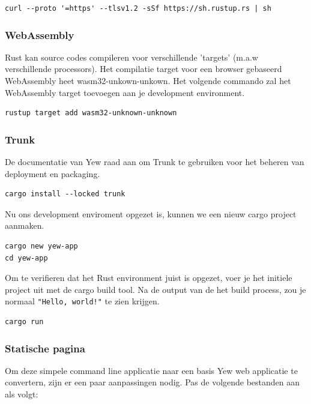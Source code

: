 \begin{verbatim}
curl --proto '=https' --tlsv1.2 -sSf https://sh.rustup.rs | sh
\end{verbatim}

\subsubsection{WebAssembly}

Rust kan source codes compileren voor verschillende 'targets' (m.a.w verschillende processors). Het
compilatie target voor een browser gebaseerd WebAssembly heet wasm32-unkown-unkown. Het volgende
commando zal het WebAssembly target toevoegen aan je development environment.

\begin{verbatim}
rustup target add wasm32-unknown-unknown
\end{verbatim}

\clearpage

\subsubsection{Trunk}

De documentatie van Yew raad aan om Trunk te gebruiken voor het beheren van deployment en packaging.

\begin{verbatim}
cargo install --locked trunk
\end{verbatim}

Nu ons development enviroment opgezet is, kunnen we een nieuw cargo project aanmaken.

\begin{verbatim}
cargo new yew-app
cd yew-app
\end{verbatim}

Om te verifieren dat het Rust environment juist is opgezet, voer je het initiele project uit met de
cargo build tool. Na de output van de het build process, zou je normaal \texttt{"Hello,
world!"} te zien
krijgen.

\begin{verbatim}
cargo run
\end{verbatim}

\subsubsection{Statische pagina}

Om deze simpele command line applicatie naar een basis Yew web applicatie te convertern, zijn er een
paar aanpassingen nodig. Pas de volgende bestanden aan als volgt:


